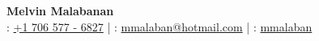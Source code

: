 \documentclass[11pt, letterpaper]{article}
\begin{document}
\begin{center}
    {\Large \textbf{Melvin Malabanan}} \\ [0.5em]
    \faPhone: \href{tel:+17065776827}{+1 706 577 - 6827} \quad | \quad
    \faEnvelope: \href{mailto:mmalaban@hotmailcom}{mmalaban@hotmail.com} \quad | \quad
    \faGithub: \href{https://github.com/mmalaban}{mmalaban}
\end{center}

\vspace{0.5em}






\end{document}

